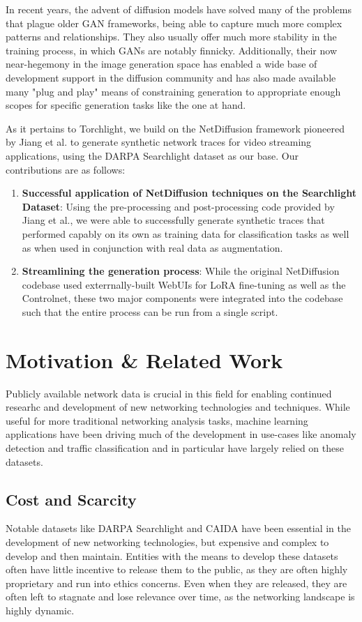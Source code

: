 \documentclass[sigconf, nonacm]{acmart}
\begin{document}
In recent years, the advent of diffusion models have solved many of the
problems that plague older GAN frameworks, being able to capture much
more complex patterns and relationships. They also usually offer much more
stability in the training process, in which GANs are notably finnicky.
Additionally, their now near-hegemony in the image generation space has
enabled a wide base of development support in the diffusion community 
and has also made available many "plug and play"
means of constraining generation to appropriate enough scopes for specific generation
tasks like the one at hand.

As it pertains to Torchlight, we build on the NetDiffusion framework pioneered
by Jiang et al. \cite{jiang2024netdiffusion} to generate synthetic network traces for video
streaming applications, using the DARPA Searchlight dataset \cite{ardi2022} as
our base. Our contributions are as follows:

\begin{enumerate}
  \item \textbf{Successful application of NetDiffusion techniques on the Searchlight Dataset}:
  Using the pre-processing and post-processing code provided by Jiang et al., we were able to
  successfully generate synthetic traces that performed capably on its own as training
  data for classification tasks as well as when used in conjunction with real data 
  as augmentation.
  \item \textbf{Streamlining the generation process}: While the original NetDiffusion codebase
  used exterrnally-built WebUIs for LoRA fine-tuning as well as the Controlnet, 
  these two major components were integrated into the codebase such that the 
  entire process can be run from a single script.
\end{enumerate}

\section{Motivation \& Related Work}
Publicly available network data is crucial in this field for enabling continued
researhc and development of new networking technologies and techniques. While useful for
more traditional networking analysis tasks, machine learning applications have been driving
much of the development in use-cases like anomaly detection and traffic classification and 
in particular have largely relied on these datasets.

\subsection{Cost and Scarcity}
Notable datasets like DARPA Searchlight and CAIDA have been essential 
in the development of new networking technologies, but expensive and complex
to develop and then maintain. Entities with the means to develop these datasets
often have little incentive to release them to the public, as they are often
highly proprietary and run into ethics concerns. Even when they are released, 
they are often left to stagnate and lose relevance over time, as the networking
landscape is highly dynamic.
\end{document}
